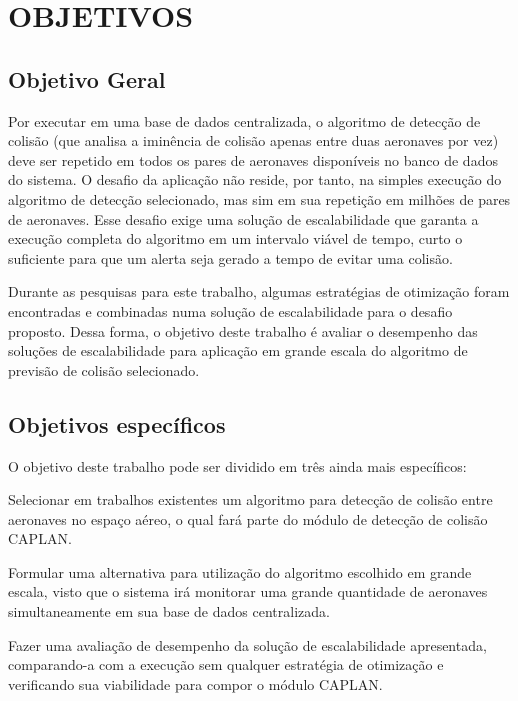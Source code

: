 \section{OBJETIVOS}

\subsection{Objetivo Geral}

Por executar em uma base de dados centralizada, o algoritmo de detecção de colisão (que analisa a iminência de colisão apenas entre duas aeronaves por vez) deve ser repetido em todos os pares de aeronaves disponíveis no banco de dados do sistema. O desafio da aplicação não reside, por tanto, na simples execução do algoritmo de detecção selecionado, mas sim em sua repetição em milhões de pares de aeronaves. Esse desafio exige uma solução de escalabilidade que garanta a execução completa do algoritmo em um intervalo viável de tempo, curto o suficiente para que um alerta seja gerado a tempo de evitar uma colisão. 

Durante as pesquisas para este trabalho, algumas estratégias de otimização foram encontradas e combinadas numa solução de escalabilidade para o desafio proposto. Dessa forma, o objetivo deste trabalho é avaliar o desempenho das soluções de escalabilidade para aplicação em grande escala do algoritmo de previsão de colisão selecionado.


\subsection{Objetivos específicos}

O objetivo deste trabalho pode ser dividido em três ainda mais específicos:

\begin{alineas}
    
    \item Selecionar em trabalhos existentes um algoritmo para detecção de colisão entre aeronaves no espaço aéreo, o qual fará parte do módulo de detecção de colisão CAPLAN.
    \item Formular uma alternativa para utilização do algoritmo escolhido em grande escala, visto que o sistema irá monitorar uma grande quantidade de aeronaves simultaneamente em sua base de dados centralizada.
    \item Fazer uma avaliação de desempenho da solução de escalabilidade apresentada, comparando-a com a execução sem qualquer estratégia de otimização e verificando sua viabilidade para compor o módulo CAPLAN. 

\end{alineas}

